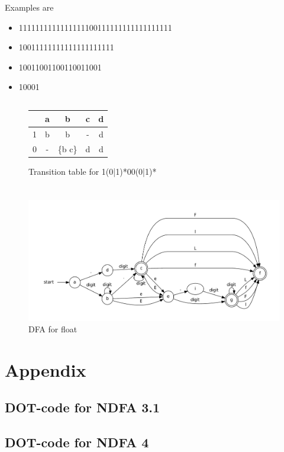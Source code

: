\documentclass{article}
\begin{document}
Examples are 
\begin{itemize}
  \item 1111111111111111100111111111111111111
  \item 10011111111111111111111
  \item 10011001100110011001
  \item 10001
\end{itemize}

\newpage

\subsection{}
\begin{figure}[h]
\begin{tabular}{|l||c|c|c|c|}
\hline
 & a & b & c & d\\
\hline
\hline
1 & b & b & - & d\\
0 & - & \{b c\} & d & d \\
\hline
\end{tabular}
\caption{Transition table for 1(0|1)*00(0|1)*}
\end{figure}
\section{}
\begin{figure}[h]
\centerline{\includegraphics[width=427px]{NDFA4.pdf}}
\caption{DFA for float}
\end{figure}
\newpage
\section*{Appendix}
\subsection*{DOT-code for NDFA 3.1}

\newpage
\subsection*{DOT-code for NDFA 4}

\end{document}
